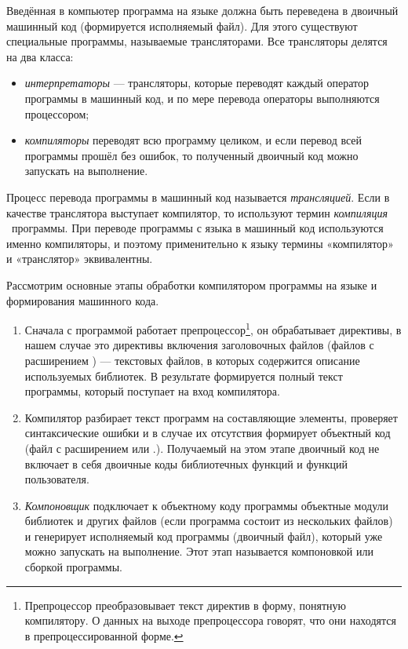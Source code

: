 Введённая в компьютер программа на языке  должна быть переведена в двоичный машинный код (формируется
исполняемый файл). Для этого существуют специальные программы, называемые трансляторами. Все
трансляторы  делятся на два класса:

\begin{itemize}
\item {}\emph{интерпретаторы} --- трансляторы, которые переводят 
каждый оператор программы в машинный код, и по мере перевода операторы
выполняются процессором; 
\item {}\emph{компиляторы} переводят всю программу целиком, и если 
перевод всей программы прошёл без ошибок, то полученный двоичный код можно
запускать на выполнение. 
\end{itemize}
Процесс перевода программы в машинный код называется \emph{трансляцией}. 
Если в качестве транслятора выступает компилятор, то используют термин \emph{компиляция}%
~программы. При переводе программы с языка  в машинный код используются именно 
компиляторы, и поэтому применительно к
языку  термины «компилятор» и «транслятор» эквивалентны.

Рассмотрим основные этапы обработки компилятором программы на языке  и формирования машинного кода.

\begin{enumerate}
\item Сначала с программой работает препроцессор\footnote{Препроцессор преобразовывает
текст директив в форму, понятную компилятору. О данных на выходе препроцессора говорят, что они находятся
в препроцессированной форме.}, он обрабатывает директивы, в нашем случае это директивы включения
заголовочных файлов (файлов с расширением ) --- текстовых файлов, в которых содержится описание используемых
библиотек. В результате формируется полный текст программы, который поступает на вход компилятора. 
\item Компилятор разбирает текст программ на составляющие элементы, проверяет синтаксические ошибки и в случае их
отсутствия формирует объектный код (файл с расширением  или .). Получаемый на этом этапе
двоичный код не включает в себя двоичные коды библиотечных функций и функций пользователя.
\item \emph{Компоновщик} подключает к объектному коду программы объектные модули библиотек и других 
файлов (если программа состоит из нескольких
файлов) и генерирует исполняемый код программы (двоичный файл), который уже можно запускать на выполнение. Этот этап
называется компоновкой или сборкой программы.
\end{enumerate}

